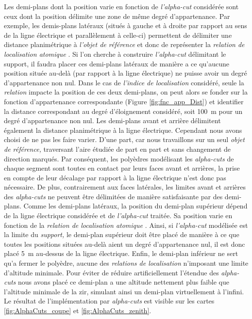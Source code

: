 Les demi-plans dont la position varie en fonction de
\emph{l'alpha-cut} considérée sont ceux dont la position délimite une
zone de même degré d'appartenance. Par exemple, les demis-plans
latéraux (\ie situés à gauche et à droite par rapport au sens de la
ligne électrique et parallèlement à celle-ci) permettent de délimiter
une distance planimétrique à \emph{l'objet de référence} et donc de
représenter la \emph{relation de localisation atomique}
. Si
l'on cherche à construire \emph{l'alpha-cut} délimitant le support, il
faudra placer ces demi-plans latéraux de manière a ce qu'aucune
position située au-delà (par rapport à la ligne électrique) ne puisse
avoir un degré d'appartenance non nul. Dans le cas de \emph{l'indice
  de localisation} considéré, seule la \emph{relation}
impacte la position de ces deux demi-plans, on peut alors se fonder
sur la fonction d'appartenance correspondante (Figure
\ref{fig:fnc_app_Dist}) et identifier la distance correspondant au
degré d'éloignement considéré, soit \SI{100}{\meter} pour un degré
d'appartenance non nul. Les demi-plans avant et arrière délimitent
également la distance planimétrique à la ligne électrique. Cependant
nous avons choisi de ne pas les faire varier. D'une part, car nous
travaillons sur un seul \emph{objet de référence,} traversant l'aire
étudiée de part en part et sans changement de direction marqués. Par
conséquent, les polyèdres modélisant les \emph{alpha-cuts} de chaque
segment sont toutes en contact par leurs faces avant et arrières, la
prise en compte de leur décalage par rapport à la ligne électrique
n'est donc pas nécessaire. De plus, contrairement aux faces latérales,
les limites avant et arrières des \emph{alpha-cuts} ne peuvent être
délimitées de manière satisfaisante par des demi-plans.
% 
Comme les demi-plans latéraux, la position du demi-plan supérieur
dépend de la ligne électrique considérée et de \emph{l'alpha-cut}
traitée. Sa position varie en fonction de la \emph{relation de
  localisation atomique}
. Ainsi,
si \emph{l'alpha-cut} modélisée est la limite du \emph{support,} le
demi-plan supérieur doit être placé de manière à ce que toutes les
positions situées au-delà aient un degré d'appartenance nul, il est
donc placé \SI{5}{\meter} au-dessus de la ligne électrique.  Enfin, le
demi-plan inférieur ne sert qu'a fermer le polyèdre, aucune des
\emph{relations de localisation} n'imposant une limite d'altitude
minimale. Pour éviter de réduire artificiellement l'étendue des
\emph{alpha-cuts} nous avons placé ce demi-plan a une altitude
nettement plus faible que l'altitude minimale de la zir,
simulant ainsi un demi-plan virtuellement à l'infini. Le résultat de l'implémentation par \emph{alpha-cuts} est visible sur
les cartes \ref{fig:AlphaCuts_coupe} et \ref{fig:AlphaCuts_zenith}.

